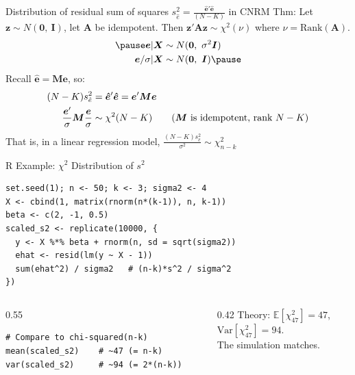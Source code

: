 \documentclass[aspectratio=169, handout, t]{beamer}
\numberwithin{equation}{section}
\begin{document}
\begin{frame}{Distribution of residual sum of squares $s_{\hat{e}}^2=\frac{\bm{\hat{e}'\hat{e}}}{(N-K)}$  in CNRM}
Thm: Let $\bm{z}\sim N(\bm{0},\ \bm{I})$, let $\bm{A}$ be idempotent.  Then $\bm{z}'\bm{A}\bm{z}\sim \chi^2(\nu)$ where $\nu=\text{Rank}(\bm{A})$.
\begin{align*}\pause
\bm{e}|\bm{X} &\sim N(\bm{0},\ \sigma^2\bm{I})\\
\bm{e}/\sigma|\bm{X} &\sim N(\bm{0},\ \bm{I}) \pause
\end{align*}
Recall $\bm{\hat{e}}=\bm{Me}$, so:
\begin{align*}
(N-K)s_{\hat{e}}^2&=\bm{\hat{e}}'\bm{\hat{e}}=\bm{e}'\bm{M}\bm{e}\\
\frac{\bm{e}'}{\sigma}\bm{M}\frac{\bm{e}}{\sigma}&\sim \chi^2(N-K) \tag{$\bm{M}$ is idempotent, rank $N-K$}
\end{align*}
That is, in a linear regression model, $\frac{(N-K)s_{\hat{e}}^2}{\sigma^2}\sim \chi^2_{n-k}$
\end{frame}

\begin{frame}[fragile]{R Example: $\chi^2$ Distribution of $s^2$}
\begin{lstlisting}[style=Rstyle]
set.seed(1); n <- 50; k <- 3; sigma2 <- 4
X <- cbind(1, matrix(rnorm(n*(k-1)), n, k-1))
beta <- c(2, -1, 0.5)
scaled_s2 <- replicate(10000, {
  y <- X %*% beta + rnorm(n, sd = sqrt(sigma2))
  ehat <- resid(lm(y ~ X - 1))
  sum(ehat^2) / sigma2   # (n-k)*s^2 / sigma^2
})
\end{lstlisting}\pause
\begin{columns}
\begin{column}{0.55\textwidth}
\begin{lstlisting}[style=Rstyle]
# Compare to chi-squared(n-k)
mean(scaled_s2)    # ~47 (= n-k)
var(scaled_s2)     # ~94 (= 2*(n-k))
\end{lstlisting}
\end{column}
\begin{column}{0.42\textwidth}
Theory: $\mathbb{E}[\chi^2_{47}]=47$,\\ $\text{Var}[\chi^2_{47}]=94$.\\[4pt]
The simulation matches.
\end{column}
\end{columns}
\end{frame}
\end{document}
